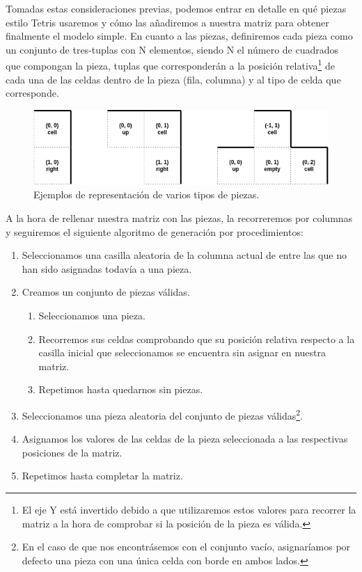 Tomadas estas consideraciones previas, podemos entrar en detalle en qué piezas estilo Tetris usaremos y cómo las añadiremos a nuestra matriz para obtener finalmente el modelo simple. En cuanto a las piezas, definiremos cada pieza como un conjunto de tres-tuplas con N elementos, siendo N el número de cuadrados que compongan la pieza, tuplas que corresponderán a la posición relativa\footnote{El eje Y está invertido debido a que utilizaremos estos valores para recorrer la matriz a la hora de comprobar si la posición de la pieza es válida.} de cada una de las celdas dentro de la pieza (fila, columna) y al tipo de celda que corresponde.\\

\begin{figure}[H]
    \begin{center}
        \includegraphics[scale=0.6]{img/piezas.png}
        \caption{Ejemplos de representación de varios tipos de piezas.}
    \end{center}
\end{figure}

A la hora de rellenar nuestra matriz con las piezas, la recorreremos por columnas y seguiremos el siguiente algoritmo de generación por procedimientos:

\begin{enumerate}
    \item Seleccionamos una casilla aleatoria de la columna actual de entre las que no han sido asignadas todavía a una pieza.
    \item Creamos un conjunto de piezas válidas.
    \begin{enumerate}
        \item Seleccionamos una pieza.
        \item Recorremos sus celdas comprobando que su posición relativa respecto a la casilla inicial que seleccionamos se encuentra sin asignar en nuestra matriz.
        \item Repetimos hasta quedarnos sin piezas.
    \end{enumerate}
    \item Seleccionamos una pieza aleatoria del conjunto de piezas válidas\footnote{En el caso de que nos encontrásemos con el conjunto vacío, asignaríamos por defecto una pieza con una única celda con borde en ambos lados.}.
    \item Asignamos los valores de las celdas de la pieza seleccionada a las respectivas posiciones de la matriz.
    \item Repetimos hasta completar la matriz.
\end{enumerate}


